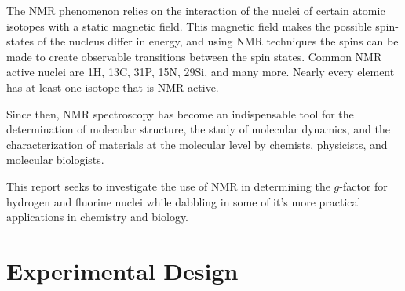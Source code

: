 \documentclass[prb,preprint]{revtex4-1}
\begin{document}
The NMR phenomenon relies on the interaction of the nuclei of certain atomic isotopes with a static magnetic field\cite{NMR}. This magnetic field makes the possible spin-states of the nucleus differ in energy, and using NMR techniques the spins can be made to create observable transitions between the spin states. Common NMR active nuclei are 1H, 13C, 31P, 15N, 29Si, and many more\cite{NMR}. Nearly every element has at least one isotope that is NMR active\cite{NMR}.

Since then, NMR spectroscopy has become an indispensable tool for the determination of molecular structure, the study of molecular dynamics, and the characterization of materials at the molecular level by chemists, physicists, and molecular biologists.

This report seeks to investigate the use of NMR in determining the $g$-factor for hydrogen and fluorine nuclei while dabbling in some of it's more practical applications in chemistry and biology.

\newpage

\section{Experimental Design}
\end{document}
